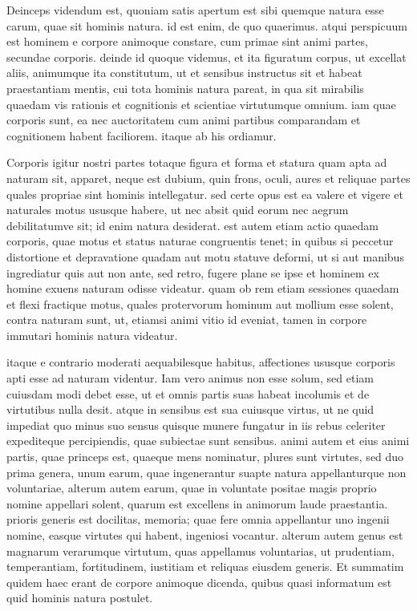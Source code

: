  Deinceps videndum est, quoniam satis apertum est sibi quemque natura esse carum, quae sit hominis natura. id est enim, de quo quaerimus. atqui perspicuum est hominem e corpore animoque constare, cum primae sint animi partes, secundae corporis. deinde id quoque videmus, et ita figuratum corpus, ut excellat aliis, animumque ita constitutum, ut et sensibus instructus sit et habeat praestantiam mentis, cui tota hominis natura pareat, in qua sit mirabilis quaedam vis rationis et cognitionis et scientiae virtutumque omnium. iam quae corporis sunt, ea nec auctoritatem cum animi partibus comparandam et cognitionem habent faciliorem. itaque ab his ordiamur.

 Corporis igitur nostri partes totaque figura et forma et statura quam apta ad naturam sit, apparet, neque est dubium, quin frons, oculi, aures et reliquae partes quales propriae sint hominis intellegatur. sed certe opus est ea valere et vigere et naturales motus ususque habere, ut nec absit quid eorum nec aegrum debilitatumve sit; id enim natura desiderat. est autem etiam actio quaedam corporis, quae motus et status naturae congruentis tenet; in quibus si peccetur distortione et depravatione quadam aut motu statuve deformi, ut si aut manibus ingrediatur quis aut non ante, sed retro, fugere plane se ipse et hominem ex homine exuens naturam odisse videatur. quam ob rem etiam sessiones quaedam et flexi fractique motus, quales protervorum hominum aut mollium esse solent, contra naturam sunt, ut, etiamsi animi vitio id eveniat, tamen in corpore immutari hominis natura videatur.

 itaque e contrario moderati aequabilesque habitus, affectiones ususque corporis apti esse ad naturam videntur. Iam vero animus non esse solum, sed etiam cuiusdam modi debet esse, ut et omnis partis suas habeat incolumis et de virtutibus nulla desit. atque in sensibus est sua cuiusque virtus, ut ne quid impediat quo minus suo sensus quisque munere fungatur in iis rebus celeriter expediteque percipiendis, quae subiectae sunt sensibus. animi autem et eius animi partis, quae princeps est, quaeque mens nominatur, plures sunt virtutes, sed duo prima genera, unum earum, quae ingenerantur suapte natura appellanturque non voluntariae, alterum autem earum, quae in voluntate positae magis proprio nomine appellari solent, quarum est excellens in animorum laude praestantia. prioris generis est docilitas, memoria; quae fere omnia appellantur uno ingenii nomine, easque virtutes qui habent, ingeniosi vocantur. alterum autem genus est magnarum verarumque virtutum, quas appellamus voluntarias, ut prudentiam, temperantiam, fortitudinem, iustitiam et reliquas eiusdem generis. Et summatim quidem haec erant de corpore animoque dicenda, quibus quasi informatum est quid hominis natura postulet.

